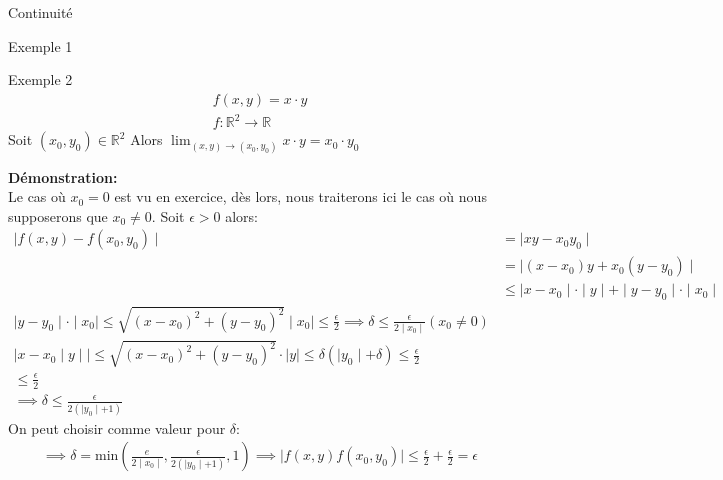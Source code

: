 \begin{parag}{Continuité}
\begin{subparag}{Exemple 1}
 \end{subparag}
 \begin{subparag}{Exemple 2}
     \begin{align*}
         f(x, y) = x \cdot y \\
         f: \mathbb{R}^2 \to \mathbb{R}
     \end{align*}
     Soit $(x_0, y_0) \in \mathbb{R}^2$ Alors $ \lim_{(x, y) \to (x_0, y_0)} x \cdot y = x_0 \cdot y_0$
     
     \textbf{Démonstration:}\\
    Le cas où $x_0 = 0$ est vu en exercice, dès lors, nous traiterons ici le cas où nous supposerons que $x_0 \neq 0$. Soit $ \epsilon > 0$ alors:
    \begin{align*}
        \mid f(x, y) - f(x_0, y_0)\mid &= \mid xy - x_0y_0 \mid  \\
        &= \mid  (x - x_0)y + x_0(y-y_0) \mid\\
        &\leq \mid x-x_0 \mid \cdot \mid y \mid + \mid y-y_0 \mid \cdot \mid x_0 \mid\\
        \mid y - y_0 \mid \cdot \mid x_0\mid \leq \sqrt{ (x-x_0)^2 + (y-y_0)^2} \mid x_0 \mid \leq  \frac{ \epsilon}{2} \implies \delta \leq \frac{ \epsilon}{2 \mid x_0 \mid} (x_0 \neq 0)\\
        \mid x - x_0 \mid y \mid\mid \leq \sqrt{ (x-x_0)^2 + (y-y_0)^2}\cdot \mid y \mid \leq  \delta  ( \mid y_0 \mid + \delta) \leq \frac{ \epsilon}{2}\\
        \leq \frac{ \epsilon}{2}\\
        \implies \delta \leq \frac{ \epsilon}{2( \mid y_0 \mid + 1)}
    \end{align*}
    On peut choisir comme valeur pour $ \delta$:
    \begin{align*}
        \implies \delta = \text{min} \left( \frac{e}{2 \mid x_0 \mid}, \frac{ \epsilon}{2( \mid y_0\mid + 1)} , 1 \right)  \implies \mid f(x, y)  f(x_0, y_0) \mid \leq \frac{ \epsilon}{2} + \frac{ \epsilon}{2} = \epsilon
    \end{align*}
    
    
     
 \end{subparag}
 \end{parag}

